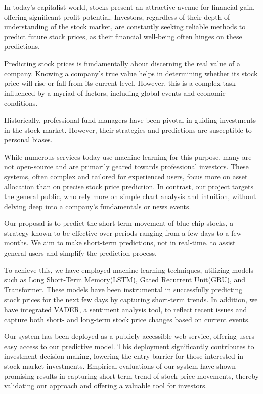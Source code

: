 In today's capitalist world, stocks present an attractive avenue for financial gain, offering significant profit potential. 
Investors, regardless of their depth of understanding of the stock market, are constantly seeking reliable methods to predict future stock prices, as their financial well-being often hinges on these predictions.

Predicting stock prices is fundamentally about discerning the real value of a company. 
Knowing a company's true value helps in determining whether its stock price will rise or fall from its current level. 
However, this is a complex task influenced by a myriad of factors, including global events and economic conditions.

Historically, professional fund managers have been pivotal in guiding investments in the stock market. 
However, their strategies and predictions are susceptible to personal biases. 

While numerous services today use machine learning for this purpose, many are not open-source and are primarily geared towards professional investors. 
These systems, often complex and tailored for experienced users, focus more on asset allocation than on precise stock price prediction. 
In contrast, our project targets the general public, who rely more on simple chart analysis and intuition, without delving deep into a company's fundamentals or news events.

Our proposal is to predict the short-term movement of blue-chip stocks, a strategy known to be effective over periods ranging from a few days to a few months. 
We aim to make short-term predictions, not in real-time, to assist general users and simplify the prediction process.

To achieve this, we have employed machine learning techniques, utilizing models such as Long Short-Term Memory(LSTM), Gated Recurrent Unit(GRU), and Transformer. 
These models have been instrumental in successfully predicting stock prices for the next few days by capturing short-term trends. 
In addition, we have integrated VADER, a sentiment analysis tool, to reflect recent issues and capture both short- and long-term stock price changes based on current events.

Our system has been deployed as a publicly accessible web service, offering users easy access to our predictive model. 
This deployment significantly contributes to investment decision-making, lowering the entry barrier for those interested in stock market investments. 
Empirical evaluations of our system have shown promising results in capturing short-term trend of stock price movements, thereby validating our approach and offering a valuable tool for investors.